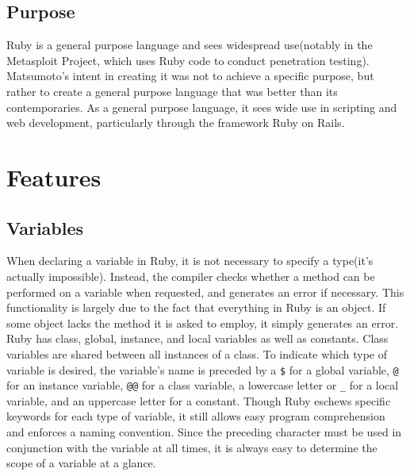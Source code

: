 \documentclass[12pt]{article}
\begin{document}
\subsection{Purpose}
Ruby is a general purpose language and sees widespread use(notably in the Metasploit Project, which uses Ruby code to conduct penetration testing)\cite{metasploit}\cite{generalRb}.  Matsumoto's intent in creating it was not to achieve a specific purpose, but rather to create a general purpose language that was better than its contemporaries\cite{rubyinterview}. As a general purpose language, it sees wide use in scripting and web development, particularly through the framework Ruby on Rails.




\section{Features}

\subsection{Variables}
When declaring a variable in Ruby, it is not necessary to specify a type(it's actually impossible). Instead, the compiler checks whether a method can be performed on a variable when requested, and generates an error if necessary. This functionality is largely due to the fact that everything in Ruby is an object. If some object lacks the method it is asked to employ, it simply generates an error.
Ruby has class, global, instance, and local variables as well as constants\cite{rbvars}. Class variables are shared between all instances of a class. To indicate which type of variable is desired, the variable's name is preceded by a \verb|$| for a global variable, \verb|@| for an instance variable, \verb|@@| for a class variable, a lowercase letter or \verb|_| for a local variable, and an uppercase letter for a constant. Though Ruby eschews specific keywords for each type of variable, it still allows easy program comprehension and enforces a naming convention. Since the preceding character must be used in conjunction with the variable at all times, it is always easy to determine the scope of a variable at a glance.
\end{document}
